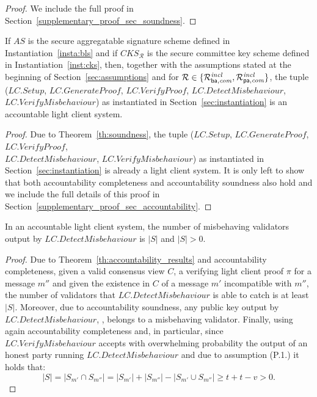 \begin{proof} 
We include the full proof in Section~\ref{supplementary_proof_sec_soundness}.   
\end{proof}

\begin{theorem} 
\label{th:accountability_results}
If $\mathit{AS}$ is the secure aggregatable signature scheme defined in Instantiation~\ref{insta:bls} and if 
$\mathit{CKS_{\mathcal{R}}}$ is the secure committee key scheme defined in Instantiation~\ref{inst:cks}, then, together 
with the assumptions stated at the beginning of Section~\ref{sec:assumptions} and for $\mathcal{R} \in \{ \mathcal{R}^{\mathit{incl}}_{\mathsf{ba},\mathit{com}}, \mathcal{R}^{\mathit{incl}}_{\mathsf{pa},\mathit{com}} \}$, the tuple 
($\mathit{LC.Setup}$, $\mathit{LC.GenerateProof}$, $\mathit{LC.VerifyProof}$, $\mathit{LC.DetectMisbehaviour}$, 
$\mathit{LC.VerifyMisbehaviour}$) as instantiated in Section~\ref{sec:instantiation} is an accountable light client system.
\end{theorem}
\begin{proof}
\noindent Due to Theorem~\ref{th:soundness}, the tuple 
($\mathit{LC.Setup}$, $\mathit{LC.GenerateProof}$, $\mathit{LC.VerifyProof}$, \\ $\mathit{LC.DetectMisbehaviour}$, 
$\mathit{LC.VerifyMisbehaviour}$) as instantiated in Section~\ref{sec:instantiation} is already a light client system. 
It is only left to show that both accountability completeness and accountability soundness also hold and we include the full details of this proof in 
Section~\ref{supplementary_proof_sec_accountability}.   
\end{proof}

\begin{corollary} In an accountable light client system, the number of misbehaving validators output by 
$\mathit{LC.DetectMisbehaviour}$ is $|S|$ and $|S| > 0$.
\end{corollary}
\begin{proof} Due to Theorem~\ref{th:accountability_results} and accountability completeness, 
given a valid consensus view $C$, a verifying light client proof $\pi$ for a message $m''$ 
and given the existence in $C$ of a message $m'$ incompatible with $m''$, the number of 
validators that $\mathit{LC.DetectMisbehaviour}$ is able to catch is at least $|S|$. Moreover, due 
to accountability soundness, any public key output by $\mathit{LC.DetectMisbehaviour}$, \ewnp, belongs to a misbehaving validator. 
Finally, using again accountability completeness and, in particular, since $\mathit{LC.VerifyMisbehaviour}$ accepts 
with overwhelming probability the output of an honest party running $\mathit{LC.DetectMisbehaviour}$ and due to assumption (P.1.) it holds that:
$$ |S| = |S_{m'} \cap S_{m''}| = |S_{m'}| + |S_{m''}| - |S_{m'} \cup S_{m''}| \geq t + t - v > 0.$$ 
\end{proof}
